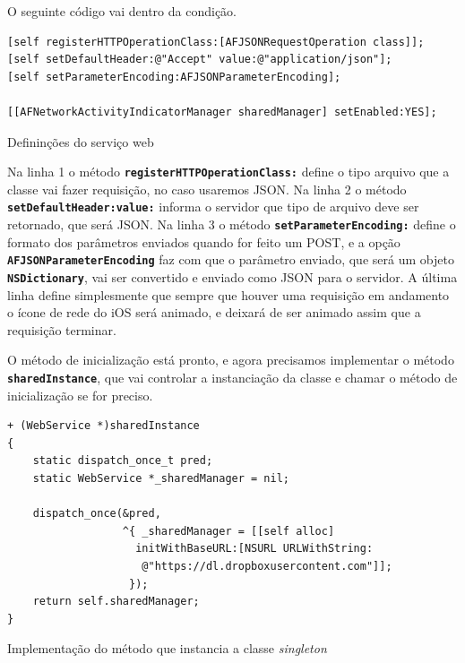\documentclass[a4paper,12pt,brazil,doubleside]{book}
\begin{document}
\begin{singlespace}
O seguinte código vai dentro da condição.

\begin{listing}[H]
\begin{verbatim}
[self registerHTTPOperationClass:[AFJSONRequestOperation class]];
[self setDefaultHeader:@"Accept" value:@"application/json"];
[self setParameterEncoding:AFJSONParameterEncoding];

[[AFNetworkActivityIndicatorManager sharedManager] setEnabled:YES];
\end{verbatim}
\caption{Defininções do serviço web}
\end{listing}


Na linha 1 o método \texttt{\textbf{registerHTTPOperationClass:}} define o tipo arquivo que a classe vai fazer requisição, no caso usaremos JSON. Na linha 2 o método\\ \texttt{\textbf{setDefaultHeader:value:}} informa o servidor que tipo de arquivo deve ser retornado, que será JSON. Na linha 3 o método \texttt{\textbf{setParameterEncoding:}} define o formato dos parâmetros enviados quando for feito um POST, e a opção \texttt{\textbf{AFJSONParameterEncoding}} faz com que o parâmetro enviado, que será um objeto \texttt{\textbf{NSDictionary}}, vai ser convertido e enviado como JSON para o servidor. A última linha define simplesmente que sempre que houver uma requisição em andamento o ícone de rede do iOS será animado, e deixará de ser animado assim que a requisição terminar.

O método de inicialização está pronto, e agora precisamos implementar o método\\ \texttt{\textbf{sharedInstance}}, que vai controlar a instanciação da classe e chamar o método de inicialização se for preciso.

\begin{listing}[H]
\begin{verbatim}
+ (WebService *)sharedInstance
{
    static dispatch_once_t pred;
    static WebService *_sharedManager = nil;
    
    dispatch_once(&pred,
                  ^{ _sharedManager = [[self alloc]
                    initWithBaseURL:[NSURL URLWithString:
                     @"https://dl.dropboxusercontent.com"]];
                   });
    return self.sharedManager;
}
\end{verbatim}
\caption{Implementação do método que instancia a classe \emph{singleton}}
\end{listing}



\end{singlespace}
\end{document}
